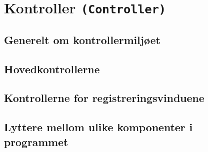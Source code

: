 \section{Kontroller \texttt{(Controller)}} \label{sec:kontroller}

\subsection{Generelt om kontrollermiljøet}
\subsection{Hovedkontrollerne}
\subsection{Kontrollerne for registreringsvinduene} \label{sec:regkontrollere}
\subsection{Lyttere mellom ulike komponenter i programmet} \label{sec:kontrollerlyttere}